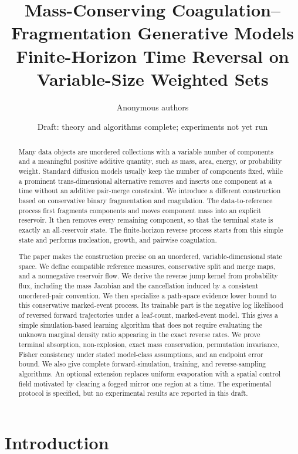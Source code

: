 \documentclass[10pt]{article}
\title{\textbf{Mass-Conserving Coagulation--Fragmentation Generative Models}\\
Finite-Horizon Time Reversal on Variable-Size Weighted Sets}
\author{Anonymous authors}
\date{Draft: theory and algorithms complete; experiments not yet run}
\theoremstyle{definition}
\theoremstyle{remark}
\begin{document}
\maketitle

\begin{abstract}
Many data objects are unordered collections with a variable number of components and a meaningful positive additive quantity, such as mass, area, energy, or probability weight.  Standard diffusion models usually keep the number of components fixed, while a prominent trans-dimensional alternative removes and inserts one component at a time without an additive pair-merge constraint.  We introduce a different construction based on conservative binary fragmentation and coagulation.  The data-to-reference process first fragments components and moves component mass into an explicit reservoir.  It then removes every remaining component, so that the terminal state is exactly an all-reservoir state.  The finite-horizon reverse process starts from this simple state and performs nucleation, growth, and pairwise coagulation.

The paper makes the construction precise on an unordered, variable-dimensional state space.  We define compatible reference measures, conservative split and merge maps, and a nonnegative reservoir flow.  We derive the reverse jump kernel from probability flux, including the mass Jacobian and the cancellation induced by a consistent unordered-pair convention.  We then specialize a path-space evidence lower bound to this conservative marked-event process.  Its trainable part is the negative log likelihood of reversed forward trajectories under a leaf-count, marked-event model.  This gives a simple simulation-based learning algorithm that does not require evaluating the unknown marginal density ratio appearing in the exact reverse rates.  We prove terminal absorption, non-explosion, exact mass conservation, permutation invariance, Fisher consistency under stated model-class assumptions, and an endpoint error bound.  We also give complete forward-simulation, training, and reverse-sampling algorithms.  An optional extension replaces uniform evaporation with a spatial control field motivated by clearing a fogged mirror one region at a time.  The experimental protocol is specified, but no experimental results are reported in this draft.
\end{abstract}

\section{Introduction}
\end{document}
